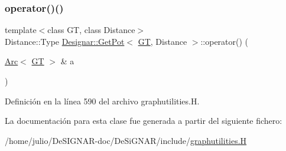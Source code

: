 \subsubsection{\texorpdfstring{operator()()}{operator()()}}
{\footnotesize\ttfamily template$<$class GT, class Distance$>$ \\
Distance\+::\+Type \hyperlink{class_designar_1_1_get_pot}{Designar\+::\+Get\+Pot}$<$ \hyperlink{demo-buildgraph_8_c_a3001c40d2c31ca87ed96cd7d1334a55e}{GT}, Distance $>$\+::operator() (\begin{DoxyParamCaption}\item[{\hyperlink{namespace_designar_a3f55fb5513d62ff47cbc8f72b8e95d6f}{Arc}$<$ \hyperlink{demo-buildgraph_8_c_a3001c40d2c31ca87ed96cd7d1334a55e}{GT} $>$ \&}]{a }\end{DoxyParamCaption})\hspace{0.3cm}{\ttfamily [inline]}}



Definición en la línea 590 del archivo graphutilities.\+H.



La documentación para esta clase fue generada a partir del siguiente fichero\+:\begin{DoxyCompactItemize}
\item 
/home/julio/\+De\+S\+I\+G\+N\+A\+R-\/doc/\+De\+Si\+G\+N\+A\+R/include/\hyperlink{graphutilities_8_h}{graphutilities.\+H}\end{DoxyCompactItemize}
